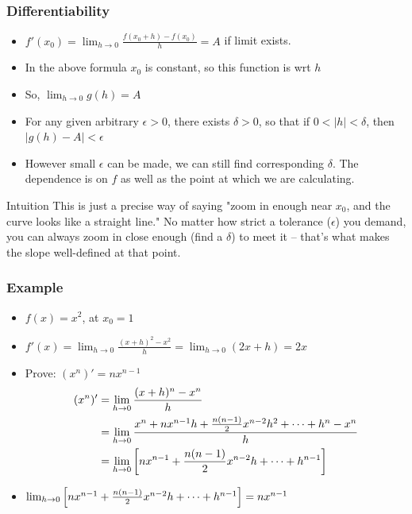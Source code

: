  \begin{frame}[fragile]\frametitle{Differentiability}
\begin{itemize}
\item $f'(x_0) = \lim_{h \to 0} \frac{f(x_0 + h) - f(x_0)}{h} = A$ if limit exists.
\item In the above formula $x_0$ is constant, so this function is wrt $h$
\item So, $\lim_{h \to 0} g(h) = A$
\item For any given arbitrary $\epsilon > 0 $, there exists $\delta > 0$, so that if $0 < | h| < \delta$, then $|g(h) - A| < \epsilon$
\item However small $\epsilon$ can be made, we can still find corresponding $\delta$. The dependence is on $f$ as well as the point at which we are calculating.
\end{itemize}

\begin{block}{Intuition}
This is just a precise way of saying "zoom in enough near $x_0$, and the curve looks like a straight line." No matter how strict a tolerance ($\epsilon$) you demand, you can always zoom in close enough (find a $\delta$) to meet it -- that's what makes the slope well-defined at that point.
\end{block}
\end{frame}

 \begin{frame}[fragile]\frametitle{Example}
\begin{itemize}
\item $f(x) = x^2$, at $x_0 = 1$
\item $f'(x) = \lim_{h \to 0} \frac{(x+h)^2 - x^2}{h} = \lim_{h \to 0} (2x + h) = 2x$
\item Prove: $(x^n)' = n x^{n-1}$
\begin{align}
(x^n)'&=\lim_{h \to 0} {(x+h)^n-x^n\over h}\\
&=\lim_{h \to 0} {x^n+nx^{n-1}h+{n(n-1)\over 2}x^{n-2}h^2+\cdots+h^n-x^n\over h} \\
&=\lim_{h \to 0} \left[ nx^{n-1}+{n(n-1)\over 2}x^{n-2}h+\cdots+h^{n-1} \right]
\end{align}
\item $\lim_{h \to 0} \left[ nx^{n-1}+{n(n-1)\over 2}x^{n-2}h+\dots+h^{n-1} \right]= nx^{n-1}$
\end{itemize}
\end{frame}

